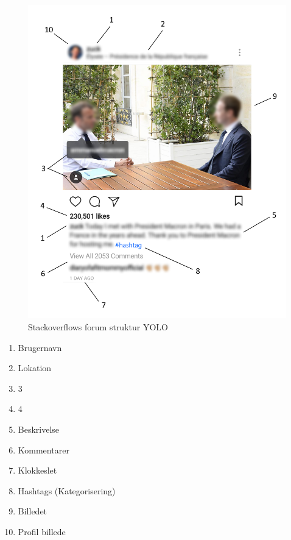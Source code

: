 \begin{table}[H]
    \begin{minipage}{.65\textwidth}
        \begin{figure}[H]
        \centering
        \includegraphics[width=1.0\linewidth ]{Projectdoc/Assets/Illustrationer/IG-meta.png} 
        \caption{Stackoverflows forum struktur YOLO}
        \label{fig:ig_metadata}
        \end{figure}
    \end{minipage}
    \begin{minipage}{.35\textwidth}
        \begin{enumerate}
            \item Brugernavn
            \item Lokation
            \item 3
            \item 4
            \item Beskrivelse
            \item Kommentarer
            \item Klokkeslet
            \item Hashtags (Kategorisering)
            \item Billedet
            \item Profil billede
        \end{enumerate}
    \end{minipage}
\end{table}

